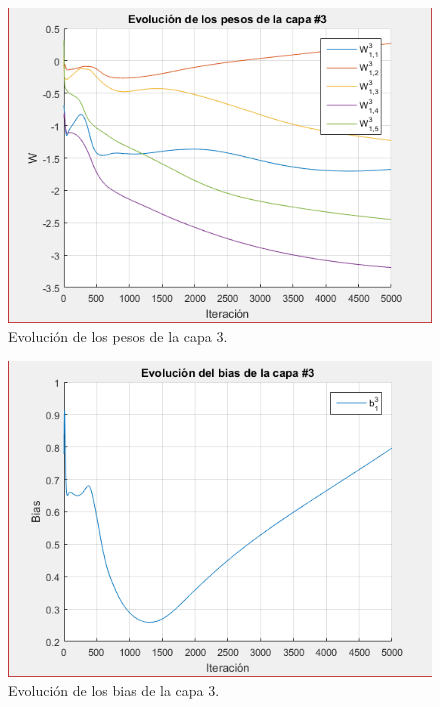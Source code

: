 \begin{figure}[H]
    \begin{center}
        \includegraphics[width=12cm]{3/pesos3.png}
        \caption{Evolución de los pesos de la capa 3.}
        \label{fig:pesos7}
    \end{center}
\end{figure}

\begin{figure}[H]
    \begin{center}
        \includegraphics[width=12cm]{3/bias3.png}
        \caption{Evolución de los bias de la capa 3.}
        \label{fig:bias7}
    \end{center}
\end{figure}

